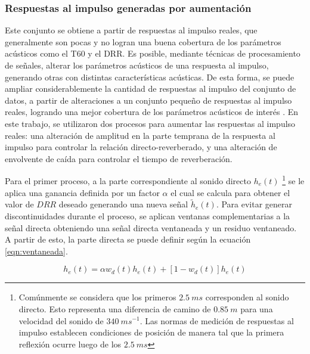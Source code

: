 \subsubsection{Respuestas al impulso generadas por aumentación}

Este conjunto se obtiene a partir de respuestas al impulso reales, que generalmente son pocas y no logran una buena cobertura de los parámetros acústicos como el T60 y el DRR. Es posible, mediante técnicas de procesamiento de señales, alterar los parámetros acústicos de una respuesta al impulso, generando otras con distintas características acústicas. De esta forma, se puede ampliar considerablemente la cantidad de respuestas al impulso del conjunto de datos, a partir de alteraciones a un conjunto pequeño de respuestas al impulso reales, logrando una mejor cobertura de los parámetros acústicos de interés \cite{rir_aug}. En este trabajo, se utilizaron dos procesos para aumentar las respuestas al impulso reales: una alteración de amplitud en la parte temprana de la respuesta al impulso para controlar la relación directo-reverberado, y una alteración de envolvente de caída para controlar el tiempo de reverberación.



Para el primer proceso, a la parte correspondiente al sonido directo $h_{e}(t)$ \footnote{Comúnmente se considera que los primeros $2.5 \ ms$ corresponden al sonido directo. Esto representa una diferencia de camino de $0.85 \ m$ para una velocidad del sonido de $340 \ ms^{-1}$. Las normas de medición de respuestas al impulso establecen condiciones de posición de manera tal que la primera reflexión ocurre luego de los $2.5 \ ms$}  se le aplica una ganancia definida por un factor $\alpha$ el cual se calcula para obtener el valor de $DRR$ deseado generando una nueva señal $\tilde{h}_{e}(t)$. Para evitar generar discontinuidades durante el proceso, se aplican ventanas complementarias a la señal directa obteniendo una señal directa ventaneada y un residuo ventaneado. A partir de esto, la parte directa se puede definir según la ecuación
\ref{eqn:ventaneada}.  

\begin{equation}
\label{eqn:ventaneada}
	h_{e}(t) = \alpha w_{d}(t)h_{e}(t) + [1-w_{d}(t)]h_{e}(t)
\end{equation} 

